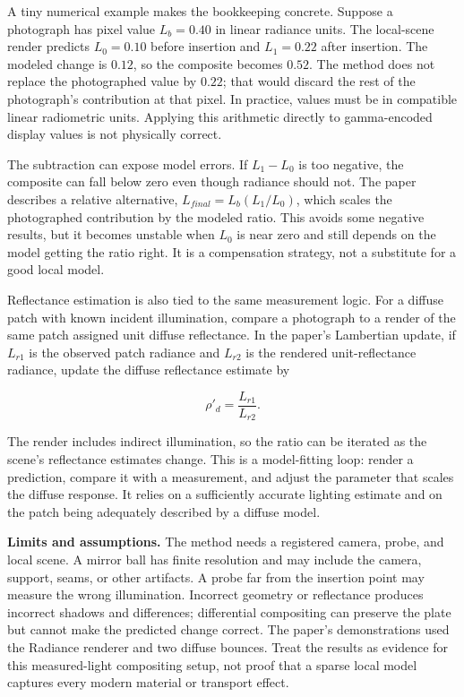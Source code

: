 A tiny numerical example makes the bookkeeping concrete. Suppose a photograph has pixel value \(L_b=0.40\) in linear radiance units. The local-scene render predicts \(L_0=0.10\) before insertion and \(L_1=0.22\) after insertion. The modeled change is \(0.12\), so the composite becomes \(0.52\). The method does not replace the photographed value by \(0.22\); that would discard the rest of the photograph's contribution at that pixel. In practice, values must be in compatible linear radiometric units. Applying this arithmetic directly to gamma-encoded display values is not physically correct.

The subtraction can expose model errors. If \(L_1-L_0\) is too negative, the composite can fall below zero even though radiance should not. The paper describes a relative alternative, \(L_{final}=L_b(L_1/L_0)\), which scales the photographed contribution by the modeled ratio. This avoids some negative results, but it becomes unstable when \(L_0\) is near zero and still depends on the model getting the ratio right. It is a compensation strategy, not a substitute for a good local model.

Reflectance estimation is also tied to the same measurement logic. For a diffuse patch with known incident illumination, compare a photograph to a render of the same patch assigned unit diffuse reflectance. In the paper's Lambertian update, if \(L_{r1}\) is the observed patch radiance and \(L_{r2}\) is the rendered unit-reflectance radiance, update the diffuse reflectance estimate by

\[\rho'_d=\frac{L_{r1}}{L_{r2}}.\]

The render includes indirect illumination, so the ratio can be iterated as the scene's reflectance estimates change. This is a model-fitting loop: render a prediction, compare it with a measurement, and adjust the parameter that scales the diffuse response. It relies on a sufficiently accurate lighting estimate and on the patch being adequately described by a diffuse model.

\textbf{Limits and assumptions.} The method needs a registered camera, probe, and local scene. A mirror ball has finite resolution and may include the camera, support, seams, or other artifacts. A probe far from the insertion point may measure the wrong illumination. Incorrect geometry or reflectance produces incorrect shadows and differences; differential compositing can preserve the plate but cannot make the predicted change correct. The paper's demonstrations used the Radiance renderer and two diffuse bounces. Treat the results as evidence for this measured-light compositing setup, not proof that a sparse local model captures every modern material or transport effect.

